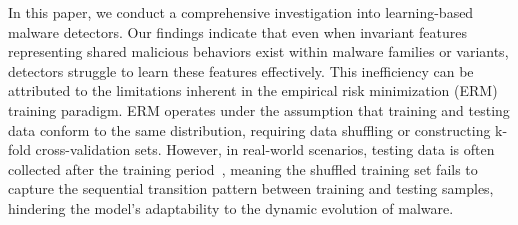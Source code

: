 
In this paper, we conduct a comprehensive investigation into learning-based malware detectors. Our findings indicate that even when invariant features representing shared malicious behaviors exist within malware families or variants, detectors struggle to learn these features effectively. This inefficiency can be attributed to the limitations inherent in the empirical risk minimization (ERM) training paradigm. ERM operates under the assumption that training and testing data conform to the same distribution, requiring data shuffling or constructing k-fold cross-validation sets. However, in real-world scenarios, testing data is often collected after the training period~\cite{tesseract}, meaning the shuffled training set fails to capture the sequential transition pattern between training and testing samples, hindering the model's adaptability to the dynamic evolution of malware.

